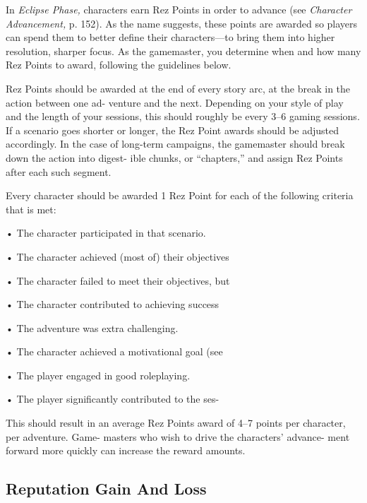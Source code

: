 In \textit{Eclipse Phase,} characters earn Rez Points in order 
to advance (see \textit{Character Advancement,} p. 152). As 
the name suggests, these points are awarded so players 
can spend them to better define their characters—to 
bring them into higher resolution, sharper focus. As 
the gamemaster, you determine when and how many 
Rez Points to award, following the guidelines below.

Rez Points should be awarded at the end of every 
story arc, at the break in the action between one ad-
venture and the next. Depending on your style of play 
and the length of your sessions, this should roughly be 
every 3–6 gaming sessions. If a scenario goes shorter 
or longer, the Rez Point awards should be adjusted 
accordingly. In the case of long-term campaigns, the 
gamemaster should break down the action into digest-
ible chunks, or ``chapters,'' and assign Rez Points after 
each such segment.

Every character should be awarded 1 Rez Point for 
each of the following criteria that is met:

•  The character participated in that scenario.

•  The character achieved (most of) their objectives 

•  The character failed to meet their objectives, but 

•  The character contributed to achieving success 

•  The adventure was extra challenging.

•  The character achieved a motivational goal (see 

•  The player engaged in good roleplaying.

•  The player significantly contributed to the ses-

This should result in an average Rez Points award 
of 4–7 points per character, per adventure. Game-
masters who wish to drive the characters' advance-
ment forward more quickly can increase the reward 
amounts. 

\subsection{Reputation Gain And Loss}

